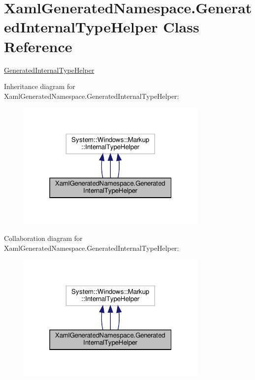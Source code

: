 \hypertarget{classXamlGeneratedNamespace_1_1GeneratedInternalTypeHelper}{}\section{Xaml\+Generated\+Namespace.\+Generated\+Internal\+Type\+Helper Class Reference}
\label{classXamlGeneratedNamespace_1_1GeneratedInternalTypeHelper}


\hyperlink{classXamlGeneratedNamespace_1_1GeneratedInternalTypeHelper}{Generated\+Internal\+Type\+Helper}  




Inheritance diagram for Xaml\+Generated\+Namespace.\+Generated\+Internal\+Type\+Helper\+:
\nopagebreak
\begin{figure}[H]
\begin{center}
\leavevmode
\includegraphics[width=265pt]{classXamlGeneratedNamespace_1_1GeneratedInternalTypeHelper__inherit__graph}
\end{center}
\end{figure}


Collaboration diagram for Xaml\+Generated\+Namespace.\+Generated\+Internal\+Type\+Helper\+:
\nopagebreak
\begin{figure}[H]
\begin{center}
\leavevmode
\includegraphics[width=265pt]{classXamlGeneratedNamespace_1_1GeneratedInternalTypeHelper__coll__graph}
\end{center}
\end{figure}
